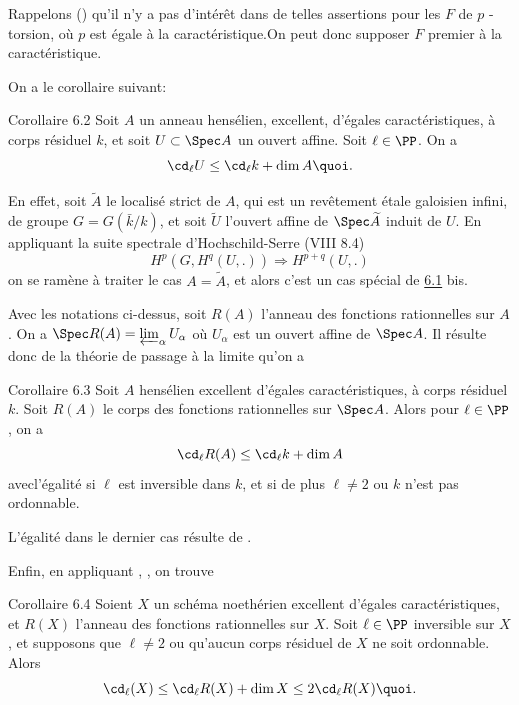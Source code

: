 \documentclass[10pt]{../fichiers-configuration-latex/smfart}
\begin{document}
Rappelons () qu'il n'y a pas d'intérêt dans de telles assertions
pour les $F$ de $p$ -torsion, où $p$ est égale à la
caractéristique.\pageoriginale On peut donc supposer $F$ premier à la
caractéristique.

On a le corollaire suivant:

\begin{enonce*}{Corollaire 6.2}
Soit $A$ un anneau hensélien, excellent, d'égales caractéristiques, à
corps résiduel $k$, et soit $U\subset \Spec A$ un ouvert affine. Soit
$\ell \in \PP$. On a
$$
\cd_{\ell}U\leq \cd_{\ell}k+\dim A{\quoi}.
$$
\end{enonce*}

En effet, soit $\widetilde{A}$ le localisé strict de $A$, qui est un
revêtement étale galoisien infini, de groupe $G=G(\bar{k}/k)$, et soit
$\widetilde{U}$ l'ouvert affine de $\Spec \widetilde{A}$ induit de
$U$. En appliquant la suite spectrale d'Hochschild-Serre (VIII 8.4)
$$
H^{p}(G,H^{q}(U,.))\Longrightarrow H^{p+q}(U,.)
$$ 
on se ramène à traiter le cas $A=\widetilde{A}$, et alors c'est un cas
spécial de \hyperref[XIX.thm6.1]{6.1} bis.

Avec les notations ci-dessus, soit $R(A)$ l'anneau des fonctions
rationnelles sur $A$. On a $\Spec R(A)=\varprojlim_{\alpha}U_{\alpha}$
où $U_{\alpha}$ est un ouvert affine de $\Spec A$. Il résulte donc de
la théorie de passage à la limite qu'on a

\begin{enonce*}{Corollaire 6.3}
Soit $A$ hensélien excellent d'égales caractéristiques, à corps
résiduel $k$. Soit $R(A)$ le corps des fonctions rationnelles sur
$\Spec A$. Alors pour $\ell \in \PP$, on a
$$
\cd_{\ell}R(A)\leq \cd_{\ell}k+\dim A
$$
avec\pageoriginale l'égalité si $\ell$ est inversible dans $k$, et si
de plus $\ell\neq 2$ ou $k$ n'est pas ordonnable.
\end{enonce*}

L'égalité dans le dernier cas résulte de .

Enfin, en appliquant , , on trouve

\begin{enonce*}{Corollaire 6.4}
Soient $X$ un schéma noethérien excellent d'égales caractéristiques,
et $R(X)$ l'anneau des fonctions rationnelles sur $X$. Soit $\ell\in
\PP$ inversible sur $X$, et supposons que $\ell\neq 2$ ou
qu'aucun corps résiduel de $X$ ne soit ordonnable. Alors
$$
\cd_{\ell}(X)\leq \cd_{\ell}R(X)+\dim X\leq 2\cd_{\ell}R(X){\quoi}.
$$
\end{enonce*}
\end{document}
